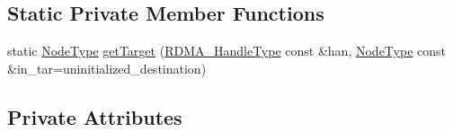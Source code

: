 \subsection*{Static Private Member Functions}
\begin{DoxyCompactItemize}
\item 
static \hyperlink{namespacevt_a866da9d0efc19c0a1ce79e9e492f47e2}{Node\+Type} \hyperlink{structvt_1_1rdma_1_1_r_d_m_a_manager_abde2782a98e21ad696be5aa621461814}{get\+Target} (\hyperlink{namespacevt_a10442579ec4e7ebef223818e64bcf908}{R\+D\+M\+A\+\_\+\+Handle\+Type} const \&han, \hyperlink{namespacevt_a866da9d0efc19c0a1ce79e9e492f47e2}{Node\+Type} const \&in\+\_\+tar=uninitialized\+\_\+destination)
\end{DoxyCompactItemize}
\subsection*{Private Attributes}
